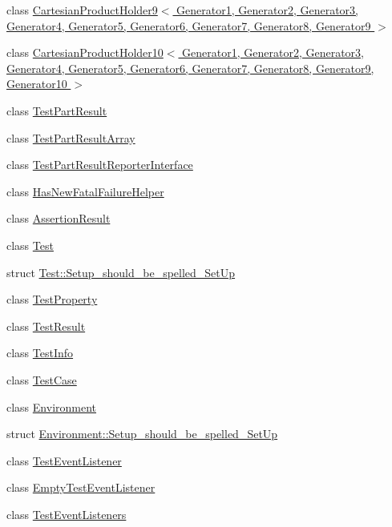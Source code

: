 \begin{DoxyCompactItemize}
\item 
class \hyperlink{classtesting_1_1internal_1_1CartesianProductHolder9}{\-Cartesian\-Product\-Holder9$<$ Generator1, Generator2, Generator3, Generator4, Generator5, Generator6, Generator7, Generator8, Generator9 $>$}
\item 
class \hyperlink{classtesting_1_1internal_1_1CartesianProductHolder10}{\-Cartesian\-Product\-Holder10$<$ Generator1, Generator2, Generator3, Generator4, Generator5, Generator6, Generator7, Generator8, Generator9, Generator10 $>$}
\item 
class \hyperlink{classtesting_1_1TestPartResult}{\-Test\-Part\-Result}
\item 
class \hyperlink{classtesting_1_1TestPartResultArray}{\-Test\-Part\-Result\-Array}
\item 
class \hyperlink{classtesting_1_1TestPartResultReporterInterface}{\-Test\-Part\-Result\-Reporter\-Interface}
\item 
class \hyperlink{classtesting_1_1internal_1_1HasNewFatalFailureHelper}{\-Has\-New\-Fatal\-Failure\-Helper}
\item 
class \hyperlink{classtesting_1_1AssertionResult}{\-Assertion\-Result}
\item 
class \hyperlink{classtesting_1_1Test}{\-Test}
\item 
struct \hyperlink{structtesting_1_1Test_1_1Setup__should__be__spelled__SetUp}{\-Test\-::\-Setup\-\_\-should\-\_\-be\-\_\-spelled\-\_\-\-Set\-Up}
\item 
class \hyperlink{classtesting_1_1TestProperty}{\-Test\-Property}
\item 
class \hyperlink{classtesting_1_1TestResult}{\-Test\-Result}
\item 
class \hyperlink{classtesting_1_1TestInfo}{\-Test\-Info}
\item 
class \hyperlink{classtesting_1_1TestCase}{\-Test\-Case}
\item 
class \hyperlink{classtesting_1_1Environment}{\-Environment}
\item 
struct \hyperlink{structtesting_1_1Environment_1_1Setup__should__be__spelled__SetUp}{\-Environment\-::\-Setup\-\_\-should\-\_\-be\-\_\-spelled\-\_\-\-Set\-Up}
\item 
class \hyperlink{classtesting_1_1TestEventListener}{\-Test\-Event\-Listener}
\item 
class \hyperlink{classtesting_1_1EmptyTestEventListener}{\-Empty\-Test\-Event\-Listener}
\item 
class \hyperlink{classtesting_1_1TestEventListeners}{\-Test\-Event\-Listeners}

\end{DoxyCompactItemize}
